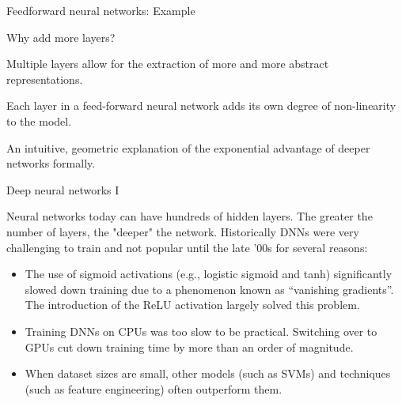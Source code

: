 \documentclass[11pt,compress,t,notes=noshow, xcolor=table]{beamer}
\begin{document}
\begin{frame} {Feedforward neural networks: Example}
\begin{figure}
\end{figure}
\end{frame}

\begin{framei}{Why add more layers?}
\item Multiple layers allow for the extraction of more and more abstract
representations.
\item Each layer in a feed-forward neural network adds its own degree of non-linearity to the model.
{}
\centerline{\footnotesize An intuitive, geometric explanation of the exponential advantage of deeper networks formally.}
\end{framei}

\begin{framei}{Deep neural networks I}

\item Neural networks today can have %
hundreds of hidden layers. The greater the number of layers, the "deeper" the network. Historically %
DNNs were very challenging to train and not popular until the late '00s for several reasons:
\vfill

\begin{itemize}
\item %
The use of sigmoid activations (e.g., logistic sigmoid and tanh) significantly slowed down training due to a phenomenon known as \enquote{vanishing gradients}. The introduction of the ReLU activation largely solved this problem.
\item Training DNNs on CPUs was too slow to be practical. Switching over to GPUs cut down training time by more than an order of magnitude.
\item When dataset sizes are small, other models (such as SVMs) and techniques (such as feature engineering) often outperform them. 
\end{itemize}

\end{framei}
\end{document}
